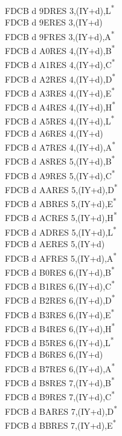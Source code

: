 \documentclass[oneside,a4paper]{book}
\begin{document}
\begin{multicols}{3}
{\begin{tabbing}
FDCB d 9D\>RES 3,(IY+d),L\textsuperscript{*}\\
FDCB d 9E\>RES 3,(IY+d)\\
FDCB d 9F\>RES 3,(IY+d),A\textsuperscript{*}\\
FDCB d A0\>RES 4,(IY+d),B\textsuperscript{*}\\
FDCB d A1\>RES 4,(IY+d),C\textsuperscript{*}\\
FDCB d A2\>RES 4,(IY+d),D\textsuperscript{*}\\
FDCB d A3\>RES 4,(IY+d),E\textsuperscript{*}\\
FDCB d A4\>RES 4,(IY+d),H\textsuperscript{*}\\
FDCB d A5\>RES 4,(IY+d),L\textsuperscript{*}\\
FDCB d A6\>RES 4,(IY+d)\\
FDCB d A7\>RES 4,(IY+d),A\textsuperscript{*}\\
FDCB d A8\>RES 5,(IY+d),B\textsuperscript{*}\\
FDCB d A9\>RES 5,(IY+d),C\textsuperscript{*}\\
FDCB d AA\>RES 5,(IY+d),D\textsuperscript{*}\\
FDCB d AB\>RES 5,(IY+d),E\textsuperscript{*}\\
FDCB d AC\>RES 5,(IY+d),H\textsuperscript{*}\\
FDCB d AD\>RES 5,(IY+d),L\textsuperscript{*}\\
FDCB d AE\>RES 5,(IY+d)\\
FDCB d AF\>RES 5,(IY+d),A\textsuperscript{*}\\
FDCB d B0\>RES 6,(IY+d),B\textsuperscript{*}\\
FDCB d B1\>RES 6,(IY+d),C\textsuperscript{*}\\
FDCB d B2\>RES 6,(IY+d),D\textsuperscript{*}\\
FDCB d B3\>RES 6,(IY+d),E\textsuperscript{*}\\
FDCB d B4\>RES 6,(IY+d),H\textsuperscript{*}\\
FDCB d B5\>RES 6,(IY+d),L\textsuperscript{*}\\
FDCB d B6\>RES 6,(IY+d)\\
FDCB d B7\>RES 6,(IY+d),A\textsuperscript{*}\\
FDCB d B8\>RES 7,(IY+d),B\textsuperscript{*}\\
FDCB d B9\>RES 7,(IY+d),C\textsuperscript{*}\\
FDCB d BA\>RES 7,(IY+d),D\textsuperscript{*}\\
FDCB d BB\>RES 7,(IY+d),E\textsuperscript{*}\\

\end{tabbing}}
\end{multicols}
\end{document}
